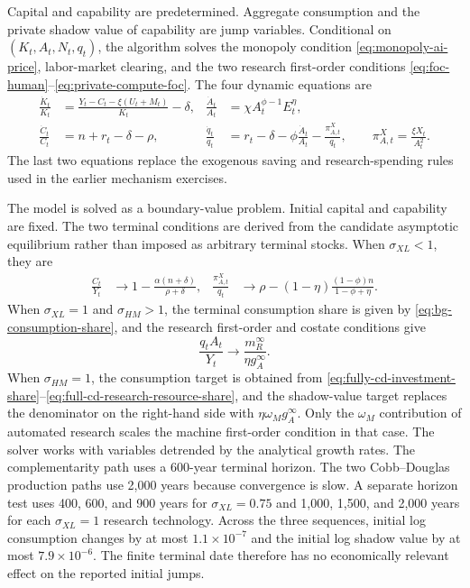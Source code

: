 Capital and capability are predetermined. Aggregate consumption and the private
shadow value of capability are jump variables. Conditional on
$(K_t,A_t,N_t,q_t)$, the algorithm solves the monopoly condition
\eqref{eq:monopoly-ai-price}, labor-market clearing, and the two research
first-order conditions \eqref{eq:foc-human}--\eqref{eq:private-compute-foc}.
The four dynamic equations are
\begin{align}
    \frac{\dot K_t}{K_t}
    &=
    \frac{Y_t-C_t-\xi(U_t+M_t)}{K_t}-\delta,
    &
    \frac{\dot A_t}{A_t}
    &=\chi A_t^{\phi-1}E_t^\eta,
    \label{eq:equilibrium-numerical-states}\\
    \frac{\dot C_t}{C_t}
    &=n+r_t-\delta-\rho,
    &
    \frac{\dot q_t}{q_t}
    &=r_t-\delta-\phi\frac{\dot A_t}{A_t}
      -\frac{\pi^X_{A,t}}{q_t},
    \qquad
    \pi^X_{A,t}=\frac{\xi X_t}{A_t^2}.
    \label{eq:equilibrium-numerical-jumps}
\end{align}
The last two equations replace the exogenous saving and research-spending rules
used in the earlier mechanism exercises.

The model is solved as a boundary-value problem. Initial capital and capability are
fixed. The two terminal conditions are derived from the candidate asymptotic
equilibrium rather than imposed as arbitrary terminal stocks. When
$\sigma_{XL}<1$, they are
\begin{align}
    \frac{C_t}{Y_t}
    &\longrightarrow
    1-\frac{\alpha(n+\delta)}{\rho+\delta},
    &
    \frac{\pi^X_{A,t}}{q_t}
    &\longrightarrow
    \rho-(1-\eta)
    \frac{(1-\phi)n}{1-\phi+\eta}.
    \label{eq:low-sigma-equilibrium-terminal}
\end{align}
When $\sigma_{XL}=1$ and $\sigma_{HM}>1$, the terminal consumption share is given by
\eqref{eq:bg-consumption-share}, and the research first-order and costate
conditions give
\begin{equation}
    \frac{q_tA_t}{Y_t}
    \longrightarrow
    \frac{m_R^\infty}{\eta g_A^\infty}.
    \label{eq:cd-equilibrium-terminal}
\end{equation}
When $\sigma_{HM}=1$, the consumption target is obtained from
\eqref{eq:fully-cd-investment-share}--\eqref{eq:full-cd-research-resource-share},
and the shadow-value target replaces the denominator on the right-hand side with
$\eta\omega_M g_A^\infty$. Only the $\omega_M$ contribution of automated research
scales the machine first-order condition in that case.
The solver works with variables detrended by the analytical growth rates. The
complementarity path uses a 600-year terminal horizon. The two Cobb--Douglas
production paths use 2,000 years because convergence is slow. A separate horizon
test uses 400, 600, and 900 years for $\sigma_{XL}=0.75$ and 1,000, 1,500, and
2,000 years for each $\sigma_{XL}=1$ research technology. Across the three
sequences, initial log consumption changes by at most $1.1\times10^{-7}$ and the
initial log shadow value by at most $7.9\times10^{-6}$. The finite terminal date
therefore has no economically relevant effect on the reported initial jumps.

